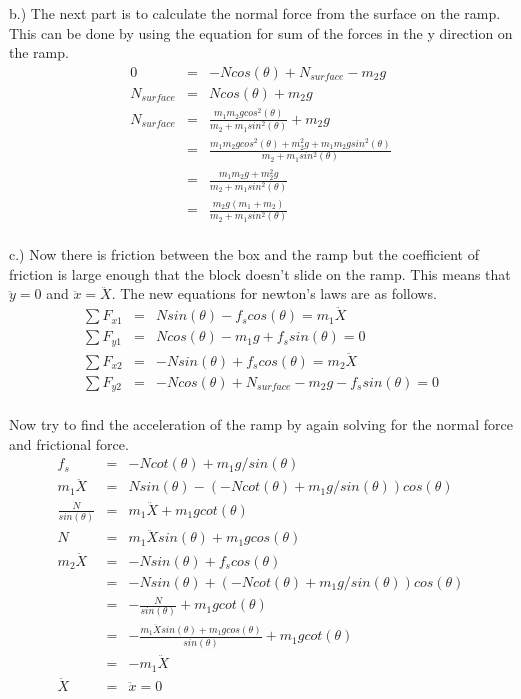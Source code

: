 \documentclass[11pt]{amsart}
\begin{document}
b.) The next part is to calculate the normal force from the surface on the ramp. This can be done by using the equation for sum of the forces in the y direction on the ramp. \\
\begin{eqnarray*}
0 &=& -Ncos(\theta)+N_{surface}-m_{2}g \\
N_{surface} &=& Ncos(\theta)+m_{2}g \\
N_{surface} &=& \frac{m_{1}m_{2}gcos^{2}(\theta)}{m_{2}+m_{1}sin^{2}(\theta)} + m_{2}g \\ 
&=& \frac{m_{1}m_{2}gcos^{2}(\theta)+m_{2}^{2}g +m_{1}m_{2}gsin^{2}(\theta)}{m_{2}+m_{1}sin^{2}(\theta)} \\
&=& \frac{m_{1}m_{2}g+m_{2}^{2}g}{m_{2}+m_{1}sin^{2}(\theta)} \\
&=& \frac{m_{2}g(m_{1}+m_{2})}{m_{2}+m_{1}sin^{2}(\theta)} 
\end{eqnarray*} \\
c.) Now there is friction between the box and the ramp but the coefficient of friction is large enough that the block doesn't slide on the ramp. This means that $\ddot{y}=0$ and $\ddot{x}=\ddot{X}$. The new equations for newton's laws are as follows.\\ 
\begin{eqnarray*}
\sum{F_{x1}} &=& Nsin(\theta) - f_{s}cos(\theta) = m_{1}\ddot{X} \\
\sum{F_{y1}} &=& Ncos(\theta)-m_{1}g+f_{s}sin(\theta) = 0 \\
\sum{F_{x2}} &=& -Nsin(\theta) +f_{s}cos(\theta) = m_{2}\ddot{X} \\
\sum{F_{y2}} &=& -Ncos(\theta)+N_{surface}-m_{2}g-f_{s}sin(\theta)=0 
\end{eqnarray*} \\
Now try to find the acceleration of the ramp by again solving for the normal force and frictional force. \\
\begin{eqnarray*} 
f_{s} &=& -Ncot(\theta)+m_{1}g/sin(\theta) \\
m_{1}\ddot{X} &=&  Nsin(\theta) -  (-Ncot(\theta)+m_{1}g/sin(\theta))cos(\theta)   \\
\frac{N}{sin(\theta)} &=& m_{1}\ddot{X} +m_{1}gcot(\theta) \\
N &=& m_{1}\ddot{X}sin(\theta) +m_{1}gcos(\theta) \\
 m_{2}\ddot{X} &=& -Nsin(\theta) +f_{s}cos(\theta) \\
 &=& -Nsin(\theta) + (-Ncot(\theta)+m_{1}g/sin(\theta))cos(\theta) \\
&=& -\frac{N}{sin(\theta)}+m_{1}gcot(\theta) \\
&=& -\frac{m_{1}\ddot{X}sin(\theta) +m_{1}gcos(\theta)}{sin(\theta)} +m_{1}gcot(\theta) \\
&=& -m_{1}\ddot{X} \\
\ddot{X} &=& \ddot{x} = 0 
\end{eqnarray*} \\
\end{document}
